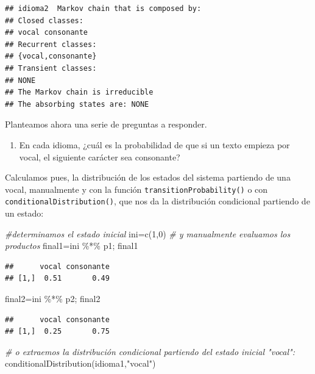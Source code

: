 \documentclass[
]{book}
\newenvironment{Shaded}{\begin{snugshade}}{\end{snugshade}}
\newcommand{\CommentTok}[1]{\textcolor[rgb]{0.56,0.35,0.01}{\textit{#1}}}
\newcommand{\DecValTok}[1]{\textcolor[rgb]{0.00,0.00,0.81}{#1}}
\newcommand{\FunctionTok}[1]{\textcolor[rgb]{0.00,0.00,0.00}{#1}}
\newcommand{\NormalTok}[1]{#1}
\newcommand{\OtherTok}[1]{\textcolor[rgb]{0.56,0.35,0.01}{#1}}
\newcommand{\SpecialCharTok}[1]{\textcolor[rgb]{0.00,0.00,0.00}{#1}}
\newcommand{\StringTok}[1]{\textcolor[rgb]{0.31,0.60,0.02}{#1}}
\providecommand{\tightlist}{%
  \setlength{\itemsep}{0pt}\setlength{\parskip}{0pt}}
\theoremstyle{definition}
\theoremstyle{definition}
\theoremstyle{definition}
\theoremstyle{definition}
\theoremstyle{remark}
\begin{document}
\begin{verbatim}
## idioma2  Markov chain that is composed by: 
## Closed classes: 
## vocal consonante 
## Recurrent classes: 
## {vocal,consonante}
## Transient classes: 
## NONE 
## The Markov chain is irreducible 
## The absorbing states are: NONE
\end{verbatim}

Planteamos ahora una serie de preguntas a responder.

\begin{enumerate}
\def\labelenumi{\arabic{enumi}.}
\tightlist
\item
  En cada idioma, ¿cuál es la probabilidad de que si un texto empieza por vocal, el siguiente carácter sea consonante?
\end{enumerate}

Calculamos pues, la distribución de los estados del sistema partiendo de una vocal, manualmente y con la función \texttt{transitionProbability()} o con \texttt{conditionalDistribution()}, que nos da la distribución condicional partiendo de un estado:

\begin{Shaded}
\begin{Highlighting}[]
\CommentTok{\#determinamos el estado inicial}
\NormalTok{ini}\OtherTok{=}\FunctionTok{c}\NormalTok{(}\DecValTok{1}\NormalTok{,}\DecValTok{0}\NormalTok{)}
\CommentTok{\# y manualmente evaluamos los productos}
\NormalTok{final1}\OtherTok{=}\NormalTok{ini }\SpecialCharTok{\%*\%}\NormalTok{ p1; final1}
\end{Highlighting}
\end{Shaded}

\begin{verbatim}
##      vocal consonante
## [1,]  0.51       0.49
\end{verbatim}

\begin{Shaded}
\begin{Highlighting}[]
\NormalTok{final2}\OtherTok{=}\NormalTok{ini }\SpecialCharTok{\%*\%}\NormalTok{ p2; final2}
\end{Highlighting}
\end{Shaded}

\begin{verbatim}
##      vocal consonante
## [1,]  0.25       0.75
\end{verbatim}

\begin{Shaded}
\begin{Highlighting}[]
\CommentTok{\# o extraemos la distribución condicional partiendo del estado inicial "vocal":}
\FunctionTok{conditionalDistribution}\NormalTok{(idioma1,}\StringTok{"vocal"}\NormalTok{)}
\end{Highlighting}
\end{Shaded}
\end{document}
